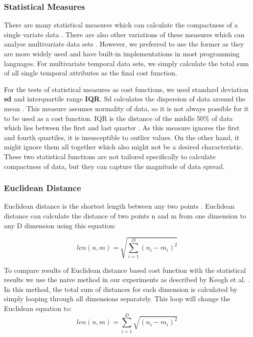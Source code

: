 \subsubsection{Statistical Measures}

There are many statistical measures which can calculate the compactness of a single variate data \cite{Watt2002}. There are also other variations of these measures which can analyse multivariate data sets \cite{Harvey1994}. However, we preferred to use the former as they are more widely used and have built-in implementations in most programming languages. For multivariate temporal data sets, we simply calculate the total sum of all single temporal attributes as the final cost function.

For the tests of statistical measures as cost functions, we used standard deviation \textbf{sd} and interquartile range \textbf{IQR}. Sd calculates the dispersion of data around the mean  \cite{Watt2002}. This measure assumes normality of data, so it is not always possible for it to be used as a cost function.   IQR is the distance of the middle 50\% of data which lies between the first and last quarter  \cite{Ross2010}. As this measure ignores the first and fourth quartiles,  it is insusceptible to outlier values. On the other hand, it might ignore them all together which also might not be a desired characteristic. These two statistical functions are not tailored specifically to calculate compactness of data, but they can capture the magnitude of data spread.

\subsubsection{Euclidean Distance}

Euclidean distance is the shortest length between any two points \cite{Deza2009}. Euclidean distance can calculate the distance of two points n and m from one dimension to any D dimension using this equation: 

\begin{equation}
len(n, m) = \sqrt{\sum_{i = 1}^{D} (n_i - m_i)^2}
\end{equation}

To compare results of Euclidean distance based cost function with the statistical results we use the naive method in our experiments as described by Keogh et al. \cite{Keogh2003}. In this method, the total sum of distances for each dimension is calculated by simply looping through all dimensions separately. This loop will change the Euclidean equation to:
\begin{equation}
len(n, m) = \sum_{i = 1}^{D} \sqrt{ (n_i - m_i)^2}
\end{equation}

